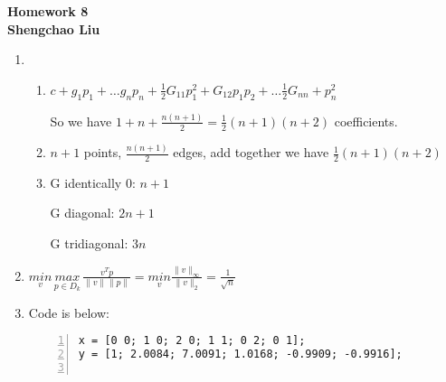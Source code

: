 \documentclass[12pt]{article}
\begin{document}
\begin{center} {\Large
{\bf Homework 8\\Shengchao Liu}}
\end{center}

\begin{enumerate}

\item

\begin{enumerate}

\item

$c + g_1 p_1 + \hdots g_n p_n + \frac{1}{2} G_{11} p_1^2 + G_{12} p_1 p_2 + \hdots \frac{1}{2} G_{nn} + p_n^2$

So we have $1 + n + \frac{n(n+1)}{2} = \frac{1}{2} (n+1)(n+2)$ coefficients.

\item

$n + 1$ points, $\frac{n(n+1)}{2}$ edges, add together we have $\frac{1}{2}(n+1)(n+2)$

\item

G identically 0: $n+1$

G diagonal: $2n+1$

G tridiagonal: $3n$

\end{enumerate}

\bigskip







\item

$\underset{v}{min} \, \underset{p \in D_k}{max} \, \frac{v^T p}{ \|v\| \|p\|} = \underset{v}{min} \frac{\|v\|_\infty}{\|v\|_2} = \frac{1}{\sqrt{n}}$

\bigskip







\item

Code is below:


\begin{lstlisting}[language={[ANSI]C}, numbers=left, numberstyle=\tiny, frame=shadowbox, basicstyle=\ttfamily\small, showspaces=false, breaklines=true, showstringspaces=false, showtabs=false]
x = [0 0; 1 0; 2 0; 1 1; 0 2; 0 1];
y = [1; 2.0084; 7.0091; 1.0168; -0.9909; -0.9916];


\end{lstlisting}
\end{enumerate}
\end{document}
